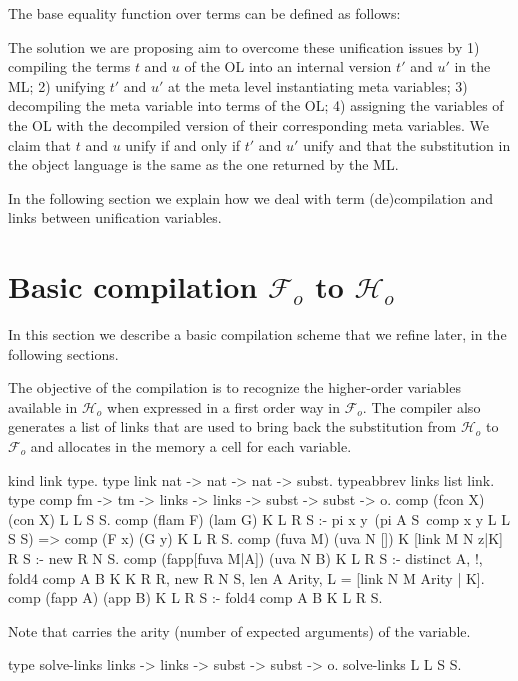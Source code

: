 \documentclass[sigconf,natbib=false,review]{acmart}
\newcommand{\Fo}{\ensuremath{\mathcal{F}_{\!o}\xspace}} %
\newcommand{\Ho}{\ensuremath{\mathcal{H}_o}\xspace}
\begin{document}
The base equality function over terms can be defined as follows:

The solution we are proposing aim to overcome these unification issues by 1)
compiling the terms $t$ and $u$ of the OL into an internal version $t'$ and $u'$
in the ML; 2) unifying $t'$ and $u'$ at the meta level instantiating meta
variables; 3) decompiling the meta variable into terms of the OL; 4) assigning
the variables of the OL with the decompiled version of their corresponding meta
variables. We claim that $t$ and $u$ unify if and only if $t'$ and $u'$ unify
and that the substitution in the object language is the same as the one returned
by the ML.  

In the following section we explain how we deal with term (de)compilation and
links between unification variables.

\section[Compilation: fo\_tm to tm]{Basic compilation \Fo{} to \Ho{}}
\label{sec:compilation}

In this section we describe a basic compilation scheme that we refine
later, in the following sections.

The objective of the compilation is to recognize the higher-order variables
available in \Ho{} when expressed in a first order way in \Fo{}. The compiler
also generates a list of links that are used to bring back the substitution from
\Ho{} to \Fo{} and allocates in the memory a cell for each variable.

\begin{elpicode}
kind link type.
type link nat -> nat -> nat -> subst. %
typeabbrev links list link.
type comp fm -> tm -> links -> links -> subst -> subst -> o.
comp (fcon X) (con X) L L S S.
comp (flam F) (lam G) K L R S :- pi x y\
  (pi A S\ comp x y L L S S) => comp (F x) (G y) K L R S.
comp (fuva M) (uva N []) K [link M N z|K] R S :- new R N S.
comp (fapp[fuva M|A]) (uva N B) K L R S :- distinct A, !,
  fold4 comp A B K K R R,
  new R N S, len A Arity,
  L = [link N M Arity | K].
comp (fapp A) (app B) K L R S :- fold4 comp A B K L R S.
\end{elpicode}

\noindent
Note that  carries the arity (number of expected arguments) of
the variable. \marginpar{say when this is needed}

\begin{elpicode}
type solve-links links -> links -> subst -> subst -> o.
solve-links L L S S.
\end{elpicode}
\end{document}
